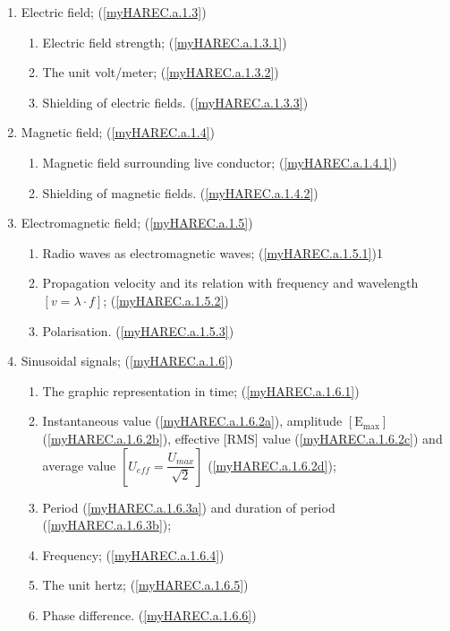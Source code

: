 \begin{enumerate}
\begin{enumerate}
\item Electric field; (\ref{myHAREC.a.1.3})\label{HAREC.a.1.3}
\begin{enumerate}
\item Electric field strength; (\ref{myHAREC.a.1.3.1})\label{HAREC.a.1.3.1}
\item The unit volt/meter; (\ref{myHAREC.a.1.3.2})\label{HAREC.a.1.3.2}
\item Shielding of electric fields. (\ref{myHAREC.a.1.3.3})\label{HAREC.a.1.3.3}
\end{enumerate}

\item Magnetic field; (\ref{myHAREC.a.1.4})\label{HAREC.a.1.4}
\begin{enumerate}
\item Magnetic field surrounding live conductor; (\ref{myHAREC.a.1.4.1})\label{HAREC.a.1.4.1}
\item Shielding of magnetic fields. (\ref{myHAREC.a.1.4.2})\label{HAREC.a.1.4.2}
\end{enumerate}

\item Electromagnetic field; (\ref{myHAREC.a.1.5})\label{HAREC.a.1.5}
\begin{enumerate}
\item Radio waves as electromagnetic waves; (\ref{myHAREC.a.1.5.1})\label{HAREC.a.1.5.1}1
\item Propagation velocity and its relation with frequency and wavelength
  \(\left[v = \lambda \cdot f\right]\);
  (\ref{myHAREC.a.1.5.2})\label{HAREC.a.1.5.2}
\item Polarisation. (\ref{myHAREC.a.1.5.3})\label{HAREC.a.1.5.3}
\end{enumerate}

\item Sinusoidal signals; (\ref{myHAREC.a.1.6})\label{HAREC.a.1.6}
\begin{enumerate}
\item The graphic representation in time;
  (\ref{myHAREC.a.1.6.1})\label{HAREC.a.1.6.1}
\item Instantaneous value (\ref{myHAREC.a.1.6.2a})\label{HAREC.a.1.6.2a},
  amplitude \(\mathrm{[E_{max}]}\)
  (\ref{myHAREC.a.1.6.2b})\label{HAREC.a.1.6.2b},
  effective [RMS] value (\ref{myHAREC.a.1.6.2c})\label{HAREC.a.1.6.2c}
  and average value \(\left[U_{eff} = \dfrac{U_{max}}{\sqrt{2}}\right]\)
  (\ref{myHAREC.a.1.6.2d})\label{HAREC.a.1.6.2d};
\item Period (\ref{myHAREC.a.1.6.3a})\label{HAREC.a.1.6.3a}
  and duration of period (\ref{myHAREC.a.1.6.3b})\label{HAREC.a.1.6.3b};
\item Frequency; (\ref{myHAREC.a.1.6.4})\label{HAREC.a.1.6.4}
\item The unit hertz; (\ref{myHAREC.a.1.6.5})\label{HAREC.a.1.6.5}
\item Phase difference. (\ref{myHAREC.a.1.6.6})\label{HAREC.a.1.6.6}
\end{enumerate}


\end{enumerate}
\end{enumerate}

